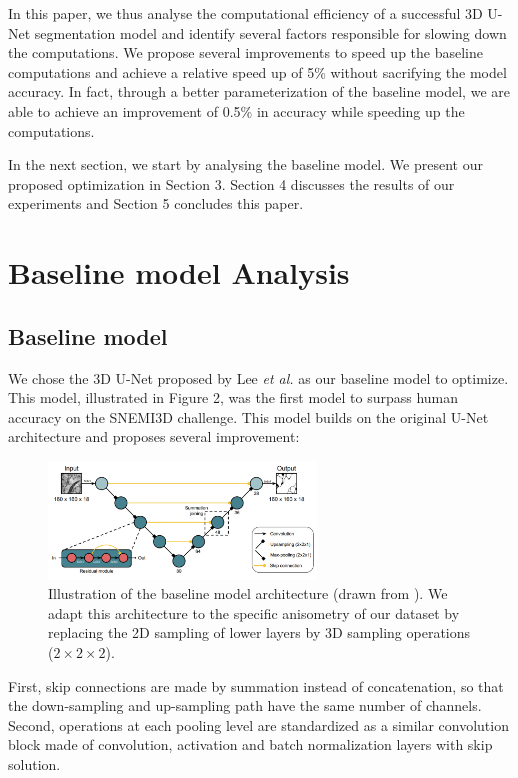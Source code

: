 \documentclass[runningheads]{llncs}
\begin{document}
In this paper, we thus analyse the computational efficiency of a successful 3D U-Net segmentation model
and identify several factors responsible for slowing down the computations. 
We propose several improvements to speed up the baseline computations and achieve a relative speed up of 5\% 
without sacrifying the model accuracy.
In fact, through a better parameterization of the baseline model, 
we are able to achieve an improvement of 0.5\% in accuracy while speeding up the computations.  

In the next section, we start by analysing the baseline model. 
We present our proposed optimization in Section 3. 
Section 4 discusses the results of our experiments and Section 5 concludes this paper.

\section{Baseline model Analysis}

\subsection{Baseline model}

We chose the 3D U-Net proposed by Lee \textit{et al.} \cite{lee2017superhuman} as our baseline model to optimize.
This model, illustrated in Figure 2, was the first model to surpass human accuracy on the SNEMI3D challenge.
This model builds on the original U-Net architecture \cite{ronneberger2015u} and proposes several improvement:

\begin{figure}[h]
\centering
\includegraphics[width=2.8in]{Architecture.png}
\caption{
Illustration of the baseline model architecture (drawn from \cite{lee2017superhuman}). 
We adapt this architecture to the specific anisometry of our dataset 
by replacing the 2D sampling of lower layers by 3D sampling operations ($2 \times 2 \times 2$).
}
\end{figure}

First, skip connections are made by summation instead of concatenation,
so that the down-sampling and up-sampling path have the same number of channels.
Second, operations at each pooling level are standardized as a similar convolution block made of 
convolution, activation and batch normalization layers with skip solution.
\end{document}
